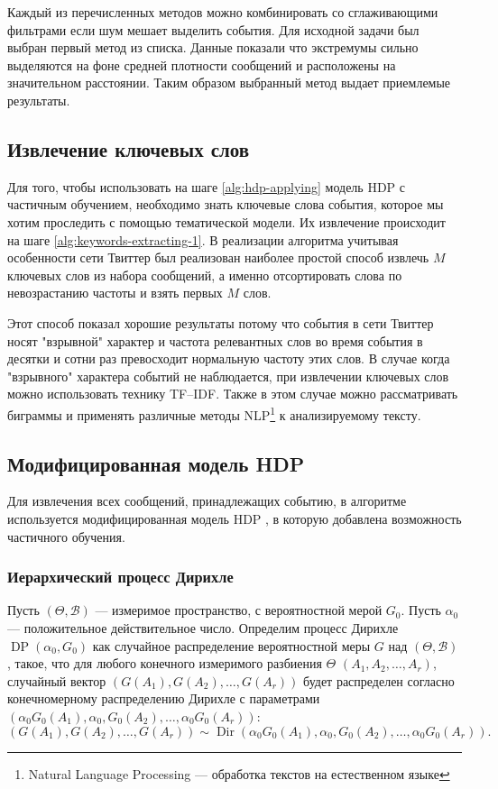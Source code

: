 \documentclass[12pt, a4paper]{article}
\DeclareMathOperator{\Dir}{Dir}
\DeclareMathOperator{\DP}{DP}
\begin{document}
  Каждый из перечисленных методов можно комбинировать со сглаживающими фильтрами если шум мешает выделить события.
  Для исходной задачи был выбран первый метод из списка. Данные показали что экстремумы сильно выделяются на фоне средней плотности сообщений и расположены на значительном расстоянии. Таким образом выбранный метод выдает приемлемые результаты.
  
  \subsection{Извлечение ключевых слов}
  Для того, чтобы использовать на шаге \ref{alg:hdp-applying} модель HDP с частичным обучением, необходимо знать ключевые слова события, которое мы хотим проследить с помощью тематической модели. Их извлечение происходит на шаге \ref{alg:keywords-extracting-1}. В реализации алгоритма учитывая особенности сети Твиттер был реализован наиболее простой способ извлечь $M$ ключевых слов из набора сообщений, а именно отсортировать слова по невозрастанию частоты и взять первых $M$ слов.
  
  Этот способ показал хорошие результаты потому что события в сети Твиттер носят "взрывной" характер и частота релевантных слов во время события в десятки и сотни раз превосходит нормальную частоту этих слов. В случае когда "взрывного" характера событий не наблюдается, при извлечении ключевых слов можно использовать технику TF--IDF. Также в этом случае можно рассматривать биграммы и применять различные методы NLP\footnote{Natural Language Processing --- обработка текстов на естественном языке} к анализируемому тексту.
  
  \subsection{Модифицированная модель HDP}
  Для извлечения всех сообщений, принадлежащих событию, в алгоритме используется модифицированная модель HDP , в которую добавлена возможность частичного обучения.
  
  \subsubsection{Иерархический процесс Дирихле}
  Пусть $(\Theta, \mathcal{B})$ --- измеримое пространство, с вероятностной мерой $G_0$. Пусть $\alpha_0$ --- положительное действительное число. Определим процесс Дирихле $\DP(\alpha_0, G_0)$ как случайное распределение вероятностной меры $G$ над $(\Theta, \mathcal{B})$, такое, что для любого конечного измеримого разбиения $\Theta$ $(A_1, A_2, \ldots, A_r)$, случайный вектор $(G(A_1), G(A_2), \ldots, G(A_r))$ будет распределен согласно конечномерному распределению Дирихле с параметрами $(\alpha_0 G_0(A_1), \alpha_0, G_0(A_2), \ldots, \alpha_0 G_0 (A_r))$:
  \begin{equation}
  (G(A_1), G(A_2), \ldots, G(A_r)) \sim \Dir(\alpha_0 G_0(A_1), \alpha_0, G_0(A_2), \ldots, \alpha_0 G_0 (A_r)).
  \end{equation}
  
\end{document}
